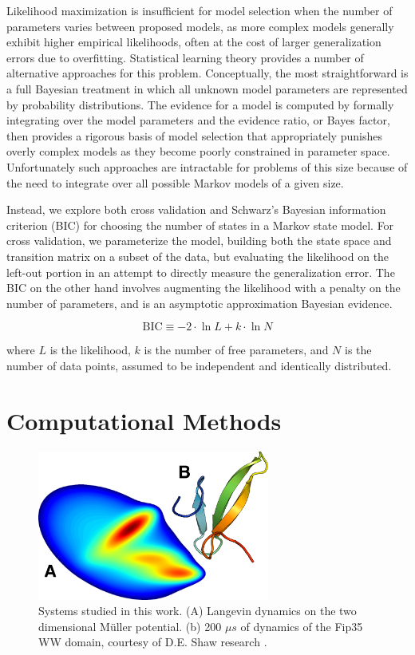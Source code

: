 \documentclass[twocolumn,floatfix,nofootinbib,aps]{revtex4-1}
\begin{document}
Likelihood maximization is insufficient for model selection when the number of parameters varies between proposed models, as more complex models generally exhibit higher empirical likelihoods, often at the cost of larger generalization errors due to overfitting\cite{Liddle2007Information, Hastie01Elements}. Statistical learning theory provides a number of alternative approaches for this problem. Conceptually, the most straightforward is a full Bayesian treatment in which all unknown model parameters are represented by probability distributions. The evidence for a model is computed by formally integrating over the model parameters and the evidence ratio, or Bayes factor\cite{Gelfand94Bayesian}, then provides a rigorous basis of model selection that appropriately punishes overly complex models as they become poorly constrained in parameter space. Unfortunately such approaches are intractable for problems of this size because of the need to integrate over all possible Markov models of a given size.

Instead, we explore both cross validation and Schwarz's Bayesian information criterion (BIC)\cite{Schwartz78Estimating} for choosing the number of states in a Markov state model. For cross validation, we parameterize the model, building both the state space and transition matrix on a subset of the data, but evaluating the likelihood on the left-out portion in an attempt to directly measure the generalization error. The BIC on the other hand involves augmenting the likelihood with a penalty on the number of parameters, and is
an asymptotic approximation Bayesian evidence.

\begin{equation}
\label{eq:bic}
\mathrm{BIC} \equiv -2\cdot \ln L + k \cdot \ln N
\end{equation}

where $L$ is the likelihood, $k$ is the number of free parameters, and $N$ is the number of data points, assumed to be independent and identically distributed.

\section{Computational Methods}

\begin{figure}
\centering
\includegraphics[width=3in]{figs/mull_ww.png}
\caption{Systems studied in this work. (A) Langevin dynamics on the two dimensional M\"{u}ller potential. (b) 200 $\mu s$ of dynamics of the Fip35 WW domain\cite{Liu2008Experimental}, courtesy of D.E. Shaw research \cite{Shaw2010Atomic}.}
\end{figure}
\end{document}
